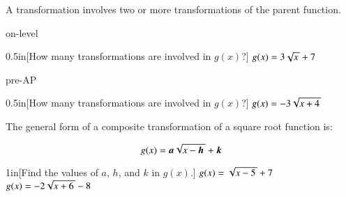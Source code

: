 A  transformation involves two or more transformations of the parent function.

\begin{taggedblock}{on-level}
    \begin{myProblem}[\normalsize]{0.5in}[How many transformations are involved in $g(x)$?]{
        $g(x) = 3 \myRoot{x} + 7$
        }
    \end{myProblem}
\end{taggedblock}
\begin{taggedblock}{pre-AP}
    \begin{myProblem}[\normalsize]{0.5in}[How many transformations are involved in $g(x)$?]{
        $g(x) = -3 \myRoot{x+4}$
        }
    \end{myProblem}
\end{taggedblock}

\vspace{2em}
The general form of a composite transformation of a square root function is:

{\centering
\begin{tcolorbox}[width=3in]
    \large%
    \[   g(x) = {\boldsymbol a} \myRoot{x-{\boldsymbol h}} + {\boldsymbol k}   \]
\end{tcolorbox}
}

\begin{my2Problems}[\normalsize]{1in}[Find the values of $a$, $h$, and $k$ in $g(x)$.]
    {
    $g(x) =  \myRoot{x-5} + 7$
    }
    {
    $g(x) = -2 \myRoot{x+6} -8$
    }
\end{my2Problems}

